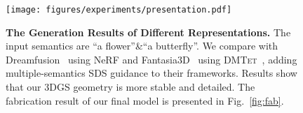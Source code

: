 \begin{figure}[t]
  \centering
  \texttt{[image: figures/experiments/presentation.pdf]}
  \caption{\textbf{The Generation Results of Different Representations.} The input semantics are ``a flower''\&``a butterfly''. We compare with Dreamfusion~\cite{stable-dreamfusion} using NeRF and Fantasia3D~\cite{chen2023fantasia3d} using \textsc{DMTet}~\cite{shen2021dmtet}, adding multiple-semantics SDS guidance to their frameworks. Results show that our 3DGS geometry is more stable and detailed. The fabrication result of our final model is presented in Fig.~\ref{fig:fab}.}
  \label{fig:presentation}
\end{figure}